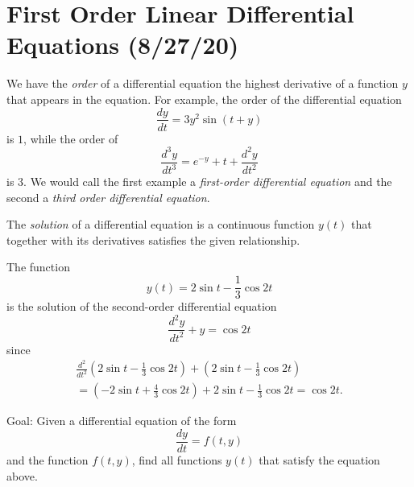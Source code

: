 \section{First Order Linear Differential Equations (8/27/20)}
\begin{definition}[Order]
    We have the \emph{order} of a differential equation the highest derivative of a function $y$ that appears in the equation. For example, the order of the differential equation \[
        \frac{dy}{dt}=3y^2\sin(t+y)
    \]
    is $1$, while the order of \[
    \frac{d^3y}{dt^3}=e^{-y}+t+\frac{d^2y}{dt^2}
    \]
    is $3$. We would call the first example a \emph{first-order differential equation} and the second a \emph{third order differential equation}.
\end{definition}
\begin{definition}[Solution]
    The \emph{solution} of a differential equation is a continuous function $y(t)$ that together with its derivatives satisfies the given relationship.
\end{definition}
\begin{example}
    The function \[
        y(t)=2\sin t - \frac{1}{3}\cos 2t
    \]
    is the solution of the second-order differential equation \[
        \frac{d^2y}{dt^2}+y= \cos 2t
    \]
    since 
    \begin{align*}
        \frac{d^2}{dt^2}\left( 2\sin t - \frac{1}{3}\cos 2t \right) + \left( 2\sin t - \frac{1}{3}\cos 2t \right) \\
        = \left( -2\sin t + \frac{4}{3} \cos 2t \right) + 2 \sin t - \frac{1}{3}\cos 2t = \cos 2t.
    \end{align*}
\end{example}

Goal: Given a differential equation of the form \[
    \frac{dy}{dt}=f(t,y)
\]
and the function $f(t,y)$, find all functions $y(t)$ that satisfy the equation above.

